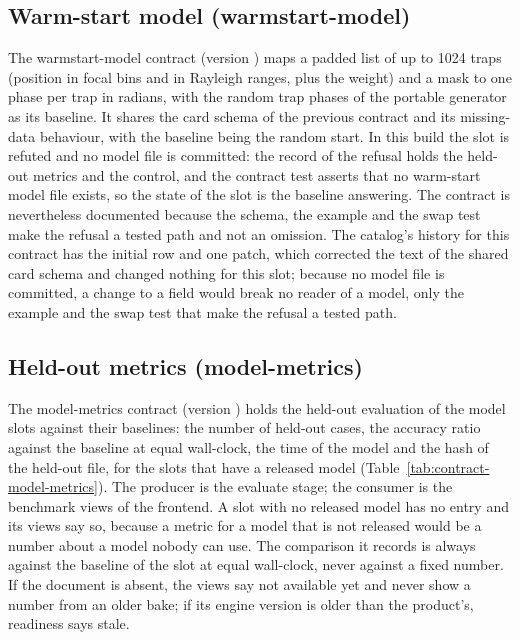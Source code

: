 

\subsection{Warm-start model (warmstart-model)}\label{sec:data-warmstart-model}

The warmstart-model contract (version ) maps a padded list of up to 1024 traps (position in focal bins and in Rayleigh ranges, plus the weight) and a mask to one phase per trap in radians, with the random trap phases of the portable generator as its baseline. It shares the card schema of the previous contract and its missing-data behaviour, with the baseline being the random start. In this build the slot is refuted and no model file is committed: the record of the refusal holds the held-out metrics and the control, and the contract test asserts that no warm-start model file exists, so the state of the slot is the baseline answering. The contract is nevertheless documented because the schema, the example and the swap test make the refusal a tested path and not an omission. The catalog's history for this contract has the initial row and one patch, which corrected the text of the shared card schema and changed nothing for this slot; because no model file is committed, a change to a field would break no reader of a model, only the example and the swap test that make the refusal a tested path.



\subsection{Held-out metrics (model-metrics)}\label{sec:data-model-metrics}

The model-metrics contract (version ) holds the held-out evaluation of the model slots against their baselines: the number of held-out cases, the accuracy ratio against the baseline at equal wall-clock, the time of the model and the hash of the held-out file, for the slots that have a released model (Table~\ref{tab:contract-model-metrics}). The producer is the evaluate stage; the consumer is the benchmark views of the frontend. A slot with no released model has no entry and its views say so, because a metric for a model that is not released would be a number about a model nobody can use. The comparison it records is always against the baseline of the slot at equal wall-clock, never against a fixed number. If the document is absent, the views say not available yet and never show a number from an older bake; if its engine version is older than the product's, readiness says stale.

